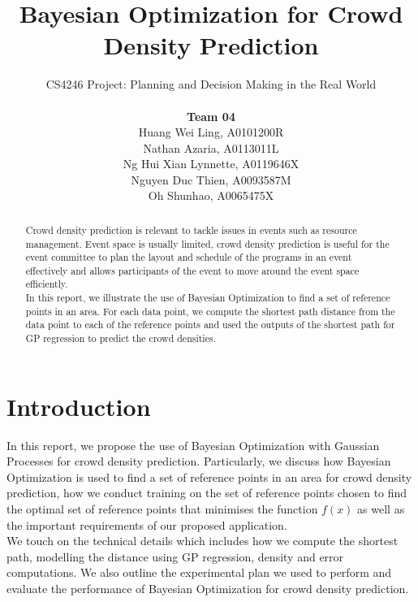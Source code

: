 \documentclass[letterpaper]{article}
\begin{document}
%
\title{Bayesian Optimization for Crowd Density Prediction}
\author{CS4246 Project: Planning and Decision Making in the Real World  \\ \\
{\bf Team 04} \\
Huang Wei Ling, A0101200R\\
Nathan Azaria, A0113011L\\
Ng Hui Xian Lynnette, A0119646X\\
Nguyen Duc Thien, A0093587M\\
Oh Shunhao, A0065475X\\
}
\maketitle
\begin{abstract}
Crowd density prediction is relevant to tackle issues in events such as resource management. Event space is usually limited, crowd density prediction is useful for the event committee to plan the layout and schedule of the programs in an event effectively and allows participants of the event to move around the event space efficiently. \\

In this report, we illustrate the use of Bayesian Optimization to find a set of reference points in an area. For each data point, we compute the shortest path distance from the data point to each of the reference points and used the outputs of the shortest path for GP regression to predict the crowd densities.
\end{abstract}

\section{Introduction}
In this report, we propose the use of Bayesian Optimization with Gaussian Processes for crowd density prediction. Particularly, we discuss how Bayesian Optimization is used to find a set of reference points in an area for crowd density prediction, how we conduct training on the set of reference points chosen to find the optimal set of reference points that minimises the function $f(x)$ as well as the important requirements of our proposed application. \\

We touch on the technical details which includes how we compute the shortest path, modelling the distance using GP regression, density and error computations. We also outline the experimental plan we used to perform and evaluate the performance of Bayesian Optimization for crowd density prediction. \\
\end{document}
